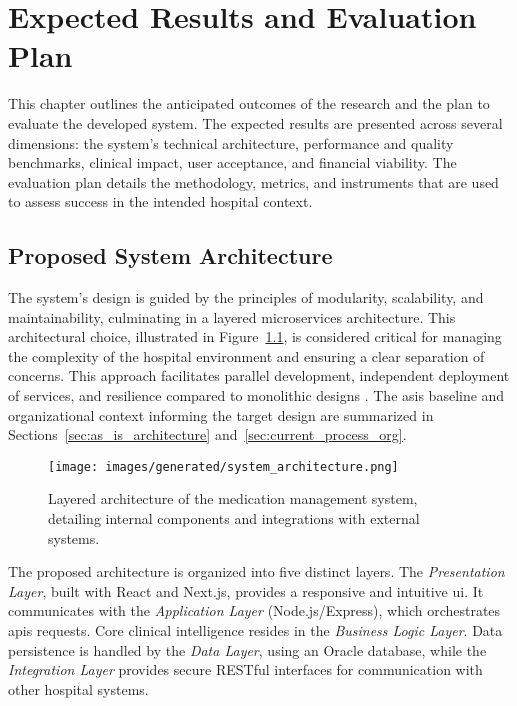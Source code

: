 \chapter{Expected Results and Evaluation Plan}
\label{chap:ExpectedResults}

This chapter outlines the anticipated outcomes of the research and the plan to evaluate the developed system. The expected results are presented across several dimensions: the system's technical architecture, performance and quality benchmarks, clinical impact, user acceptance, and financial viability. The evaluation plan details the methodology, metrics, and instruments that are used to assess success in the intended hospital context.

\section{Proposed System Architecture}

The system's design is guided by the principles of modularity, scalability, and maintainability, culminating in a layered microservices architecture. This architectural choice, illustrated in Figure~\ref{fig:architecture}, is considered critical for managing the complexity of the hospital environment and ensuring a clear separation of concerns. This approach facilitates parallel development, independent deployment of services, and resilience compared to monolithic designs \cite{newman2015}. The as\-is baseline and organizational context informing the target design are summarized in Sections~\ref{sec:as_is_architecture} and~\ref{sec:current_process_org}.

\begin{figure}[htbp]
    \centering
    \texttt{[image: images/generated/system\_architecture.png]}
    \caption{Layered architecture of the medication management system, detailing internal components and integrations with external systems.}
    \label{fig:architecture}
\end{figure}

The proposed architecture is organized into five distinct layers. The \textit{Presentation Layer}, built with React and Next.js, provides a responsive and intuitive \gls{ui}. It communicates with the \textit{Application Layer} (Node.js/\-Express), which orchestrates \glspl{api} requests. Core clinical intelligence resides in the \textit{Business Logic Layer}. Data persistence is handled by the \textit{Data Layer}, using an Oracle database, while the \textit{Integration Layer} provides secure RESTful interfaces for communication with other hospital systems.

